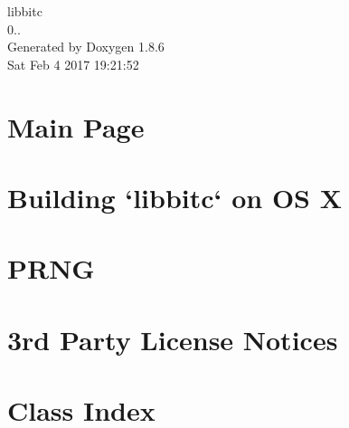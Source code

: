 \documentclass[twoside]{book}
\newcommand{\clearemptydoublepage}{%
  \newpage{\pagestyle{empty}\cleardoublepage}%
}
\begin{document}
\hypersetup{pageanchor=false}
\begin{titlepage}
\vspace*{7cm}
\begin{center}%
{\Large libbitc \\[1ex]\large 0.. }\\
\vspace*{1cm}
{\large Generated by Doxygen 1.8.6}\\
\vspace*{0.5cm}
{\small Sat Feb 4 2017 19:21:52}\\
\end{center}
\end{titlepage}
\clearemptydoublepage
\tableofcontents
\clearemptydoublepage
{}
\hypersetup{pageanchor=true}

\chapter{Main Page}
\label{index}\hypertarget{index}{}
\chapter{Building `libbitc` on O\-S X}
\label{md__home_ubuntu_workspace_doc_build-osx}
\hypertarget{md__home_ubuntu_workspace_doc_build-osx}{}

\chapter{P\-R\-N\-G}
\label{md__home_ubuntu_workspace_doc_PRNG}
\hypertarget{md__home_ubuntu_workspace_doc_PRNG}{}

\chapter{3rd Party License Notices}
\label{md__home_ubuntu_workspace_LICENSE-3RD-PARTY}
\hypertarget{md__home_ubuntu_workspace_LICENSE-3RD-PARTY}{}

\chapter{Class Index}

\end{document}
